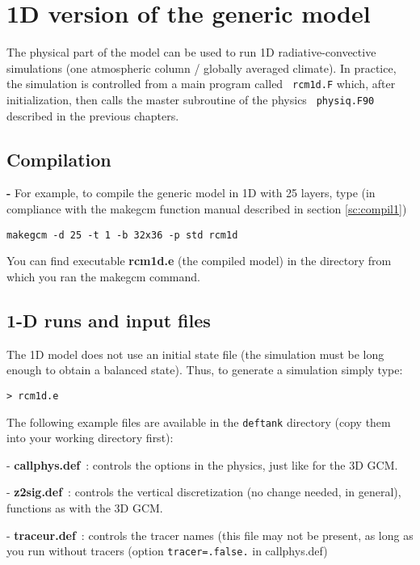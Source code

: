 \chapter{1D version of the generic model}

\label{sc:rcm1d}

The physical part of the model can be used to run 1D radiative-convective simulations (one atmospheric column / globally averaged climate). In practice, the simulation is controlled from a main program called \verb+ rcm1d.F+ which, after initialization, then calls the master subroutine of the physics \verb+ physiq.F90+ described in the previous chapters.

\section{Compilation}
{\bf -} For example, to compile the generic model in 1D with 25 layers, type (in compliance with the makegcm function manual described in section \ref{sc:compil1})

\begin{verbatim}
makegcm -d 25 -t 1 -b 32x36 -p std rcm1d
\end{verbatim}

You can find executable {\bf rcm1d.e} (the compiled model)
in the directory from which you ran the makegcm command.

\section{1-D runs and input files}

The 1D model does not use an initial state file (the simulation must be long enough to obtain a balanced state). Thus, to generate a simulation simply type:

\begin{verbatim}
> rcm1d.e
\end{verbatim}

The following example files are available in the {\tt deftank} directory
(copy them into your working directory first):

- {\bf callphys.def}~: controls the options in the physics,
  just like for the 3D GCM.

- {\bf z2sig.def}~:
 controls the vertical discretization
 (no change needed, in general), functions as with the 3D GCM.

- {\bf traceur.def}~:
 controls the tracer names (this file may not be present, as long
 as you run without tracers (option {\tt tracer=.false.} in
 callphys.def)

